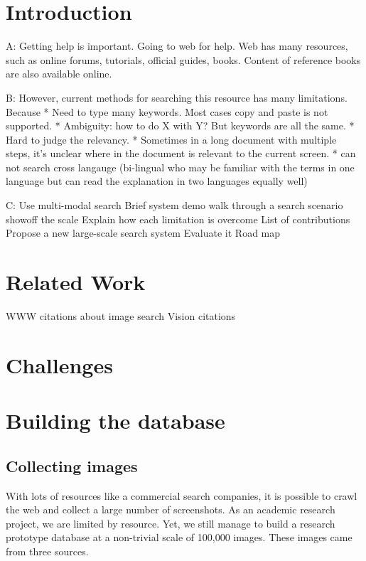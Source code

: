 \section{Introduction}

A: Getting help is important. Going to web for help. Web has many
resources, such as online forums, tutorials, official guides,
books. Content of reference books are also available online.

B: However, current methods for searching this resource has many
limitations. Because
* Need to type many keywords. Most cases copy and paste is not supported.
* Ambiguity: how to do X with Y? But keywords are all the same.
* Hard to judge the relevancy.
* Sometimes in a long document with multiple steps, it's unclear
where in the document is relevant to the current screen.
* can not search cross langauge (bi-lingual who may be familiar
with the terms in one language but can read the explanation in two
languages equally well)

C: Use multi-modal search
    Brief system demo
        walk through a search scenario
        showoff the scale
    Explain how each limitation is overcome
    List of contributions
        Propose a new large-scale search system
        Evaluate it
    Road map

\section{Related Work}
    WWW citations about image search
    Vision citations

\section{Challenges}

\section{Building the database}

\subsection{Collecting images}

With lots of resources like a commercial search companies, it is
possible to crawl the web and collect a large number of
screenshots. As an academic research project, we are limited by
resource. Yet, we still manage to build a research prototype
database at a non-trivial scale of 100,000 images. These images
came from three sources.


